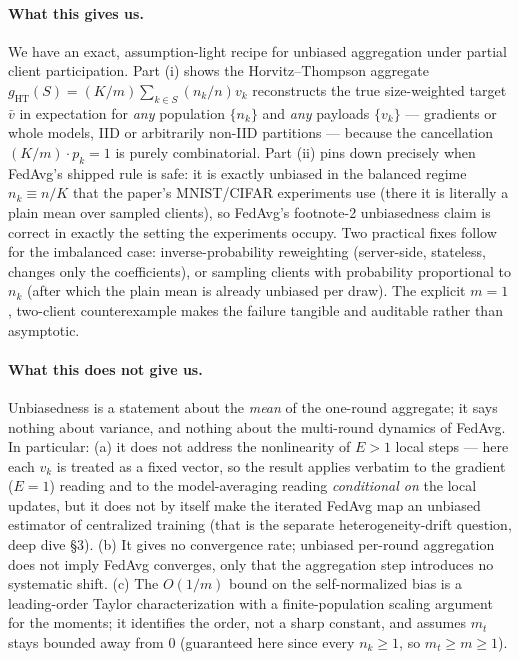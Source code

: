 \documentclass[11pt]{article}
\theoremstyle{definition}
\theoremstyle{remark}
\begin{document}
\paragraph{What this gives us.}
We have an exact, assumption-light recipe for unbiased aggregation under partial client participation. Part (i) shows the Horvitz--Thompson aggregate $g_{\mathrm{HT}}(S)=(K/m)\sum_{k\in S}(n_k/n)v_k$ reconstructs the true size-weighted target $\bar v$ in expectation for \emph{any} population $\{n_k\}$ and \emph{any} payloads $\{v_k\}$ --- gradients or whole models, IID or arbitrarily non-IID partitions --- because the cancellation $(K/m)\cdot p_k=1$ is purely combinatorial. Part (ii) pins down precisely when FedAvg's shipped rule is safe: it is exactly unbiased in the balanced regime $n_k\equiv n/K$ that the paper's MNIST/CIFAR experiments use (there it is literally a plain mean over sampled clients), so FedAvg's footnote-2 unbiasedness claim is correct in exactly the setting the experiments occupy. Two practical fixes follow for the imbalanced case: inverse-probability reweighting (server-side, stateless, changes only the coefficients), or sampling clients with probability proportional to $n_k$ (after which the plain mean is already unbiased per draw). The explicit $m=1$, two-client counterexample makes the failure tangible and auditable rather than asymptotic.

\paragraph{What this does not give us.}
Unbiasedness is a statement about the \emph{mean} of the one-round aggregate; it says nothing about variance, and nothing about the multi-round dynamics of FedAvg. In particular: (a) it does not address the nonlinearity of $E>1$ local steps --- here each $v_k$ is treated as a fixed vector, so the result applies verbatim to the gradient ($E=1$) reading and to the model-averaging reading \emph{conditional on} the local updates, but it does not by itself make the iterated FedAvg map an unbiased estimator of centralized training (that is the separate heterogeneity-drift question, deep dive \S 3). (b) It gives no convergence rate; unbiased per-round aggregation does not imply FedAvg converges, only that the aggregation step introduces no systematic shift. (c) The $O(1/m)$ bound on the self-normalized bias is a leading-order Taylor characterization with a finite-population scaling argument for the moments; it identifies the order, not a sharp constant, and assumes $m_t$ stays bounded away from $0$ (guaranteed here since every $n_k\ge1$, so $m_t\ge m\ge1$).
\end{document}
